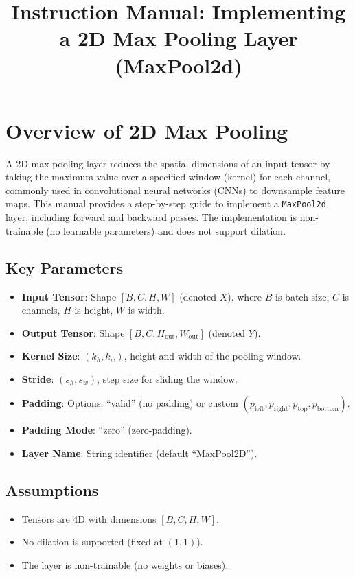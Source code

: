 \documentclass{article}
\begin{document}
\title{Instruction Manual: Implementing a 2D Max Pooling Layer (MaxPool2d)}
\author{}
\date{}
\maketitle

\section{Overview of 2D Max Pooling}

A 2D max pooling layer reduces the spatial dimensions of an input tensor by taking the maximum value over a specified window (kernel) for each channel, commonly used in convolutional neural networks (CNNs) to downsample feature maps. This manual provides a step-by-step guide to implement a \texttt{MaxPool2d} layer, including forward and backward passes. The implementation is non-trainable (no learnable parameters) and does not support dilation.

\subsection{Key Parameters}
\begin{itemize}
    \item \textbf{Input Tensor}: Shape $[B, C, H, W]$ (denoted $X$), where $B$ is batch size, $C$ is channels, $H$ is height, $W$ is width.
    \item \textbf{Output Tensor}: Shape $[B, C, H_{\text{out}}, W_{\text{out}}]$ (denoted $Y$).
    \item \textbf{Kernel Size}: $(k_h, k_w)$, height and width of the pooling window.
    \item \textbf{Stride}: $(s_h, s_w)$, step size for sliding the window.
    \item \textbf{Padding}: Options: ``valid'' (no padding) or custom $(p_{\text{left}}, p_{\text{right}}, p_{\text{top}}, p_{\text{bottom}})$.
    \item \textbf{Padding Mode}: ``zero'' (zero-padding).
    \item \textbf{Layer Name}: String identifier (default ``MaxPool2D'').
\end{itemize}

\subsection{Assumptions}
\begin{itemize}
    \item Tensors are 4D with dimensions $[B, C, H, W]$.
    \item No dilation is supported (fixed at $(1, 1)$).
    \item The layer is non-trainable (no weights or biases).
\end{itemize}
\end{document}
